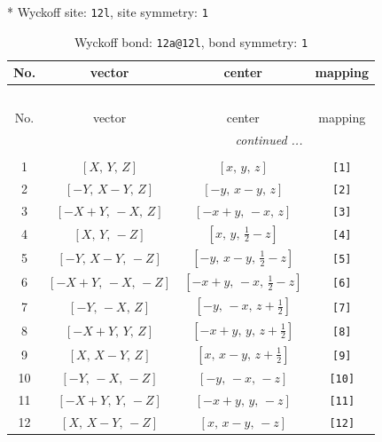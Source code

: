\documentclass[fleqn,8pt]{jsarticle}
\begin{document}
* Wyckoff site: {\tt 12l}, site symmetry: {\tt 1}
\renewcommand{\arraystretch}{1.2}
\begin{longtable}{cccc}
\caption{Wyckoff bond: {\tt 12a@12l}, bond symmetry: {\tt 1}}
 \\
 \hline \hline
No. & vector & center & mapping \\ \hline \endfirsthead

\multicolumn{3}{l}{\tablename\ \thetable{}} \\
 \hline \hline
No. & vector & center & mapping \\ \hline \endhead

 \hline \hline
\multicolumn{3}{r}{\footnotesize\it continued ...} \\ \endfoot

 \hline \hline
\multicolumn{3}{r}{} \\ \endlastfoot

1 & $\left[ X,\, Y,\, Z \right]$ & $\left[ x,\, y,\, z \right]$ & {\tt [1]} \\ \hline
2 & $\left[ - Y,\, X - Y,\, Z \right]$ & $\left[ - y,\, x - y,\, z \right]$ & {\tt [2]} \\ \hline
3 & $\left[ - X + Y,\, - X,\, Z \right]$ & $\left[ - x + y,\, - x,\, z \right]$ & {\tt [3]} \\ \hline
4 & $\left[ X,\, Y,\, - Z \right]$ & $\left[ x,\, y,\, \frac{1}{2} - z \right]$ & {\tt [4]} \\ \hline
5 & $\left[ - Y,\, X - Y,\, - Z \right]$ & $\left[ - y,\, x - y,\, \frac{1}{2} - z \right]$ & {\tt [5]} \\ \hline
6 & $\left[ - X + Y,\, - X,\, - Z \right]$ & $\left[ - x + y,\, - x,\, \frac{1}{2} - z \right]$ & {\tt [6]} \\ \hline
7 & $\left[ - Y,\, - X,\, Z \right]$ & $\left[ - y,\, - x,\, z + \frac{1}{2} \right]$ & {\tt [7]} \\ \hline
8 & $\left[ - X + Y,\, Y,\, Z \right]$ & $\left[ - x + y,\, y,\, z + \frac{1}{2} \right]$ & {\tt [8]} \\ \hline
9 & $\left[ X,\, X - Y,\, Z \right]$ & $\left[ x,\, x - y,\, z + \frac{1}{2} \right]$ & {\tt [9]} \\ \hline
10 & $\left[ - Y,\, - X,\, - Z \right]$ & $\left[ - y,\, - x,\, - z \right]$ & {\tt [10]} \\ \hline
11 & $\left[ - X + Y,\, Y,\, - Z \right]$ & $\left[ - x + y,\, y,\, - z \right]$ & {\tt [11]} \\ \hline
12 & $\left[ X,\, X - Y,\, - Z \right]$ & $\left[ x,\, x - y,\, - z \right]$ & {\tt [12]} \\
\end{longtable}
\end{document}
